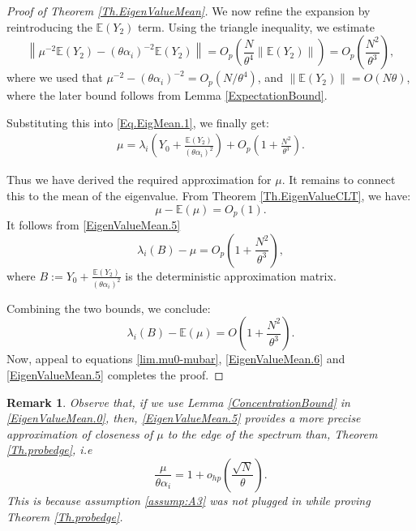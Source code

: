 \documentclass[11pt, reqno]{amsart}
\numberwithin{equation}{section}
\newtheorem{remark}{Remark}[section]
\begin{document}
\begin{proof}[Proof of Theorem \ref{Th.EigenValueMean}]
We now refine the expansion by reintroducing the \( \mathbb{E}(Y_2) \) term. Using the triangle inequality, we estimate
\[
\left\| \mu^{-2} \mathbb{E}(Y_2) - (\theta\alpha_i)^{-2} \mathbb{E}(Y_2) \right\| = O_p\left(\frac{N}{\theta^4} \|\mathbb{E}(Y_2)\|\right) = O_p\left(\frac{N^2}{\theta^3}\right),
\]
where we used that \( \mu^{-2} - (\theta\alpha_i)^{-2} = O_p(N/\theta^4) \), and \( \|\mathbb{E}(Y_2)\| = O(N\theta) \), where the later bound follows from Lemma \ref{ExpectationBound}.

Substituting this into \eqref{Eq.EigMean.1}, we finally get:
\begin{align}
\label{EigenValueMean.5}\mu = \lambda_i\left(Y_0 + \frac{\mathbb{E}(Y_2)}{(\theta\alpha_i)^2}\right) + O_p\left(1 + \frac{N^2}{\theta^3}\right).
\end{align}

Thus we have derived the required approximation for \( \mu \). It remains to connect this to the mean of the eigenvalue. From Theorem \ref{Th.EigenValueCLT}, we have:
\[
\mu - \mathbb{E}(\mu) = O_p(1).
\]
It follows from \eqref{EigenValueMean.5}
\[
\lambda_i(B) - \mu = O_p\left(1 + \frac{N^2}{\theta^3}\right),
\]
where \( B := Y_0 + \frac{\mathbb{E}(Y_2)}{(\theta\alpha_i)^2} \) is the deterministic approximation matrix.

Combining the two bounds, we conclude:
\[
\lambda_i(B) - \mathbb{E}(\mu) = O\left(1 + \frac{N^2}{\theta^3}\right).
\]
Now, appeal to equations \eqref{lim.mu0-mubar}, \eqref{EigenValueMean.6} and \eqref{EigenValueMean.5} completes the proof.
\end{proof}
\begin{remark}
Observe that, if we use Lemma \ref{ConcentrationBound} in \eqref{EigenValueMean.0}, then, \eqref{EigenValueMean.5} provides a more precise approximation of closeness of $\mu$ to the edge of the spectrum than, Theorem \ref{Th.probedge}, i.e 
\begin{equation}\label{approx.mu/theta}
\frac{\mu}{\theta\alpha_i} = 1+ o_{hp}\left(\frac{\sqrt{N}}{\theta}\right).  
\end{equation}
This is because assumption \ref{assump:A3} was not plugged in while proving Theorem \ref{Th.probedge}.
\end{remark}
\end{document}
